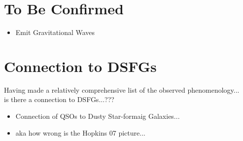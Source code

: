 \documentclass[usenatbib]{mn2e}
\begin{document}
\section{To Be Confirmed} %
\begin{itemize}
  \item{Emit Gravitational Waves}
\end{itemize}


\section{Connection to DSFGs} 
Having made a relatively comprehensive list of the observed phenomenology...\\
is there a connection to  DSFGs...???\\
\begin{itemize}
  \item{Connection of QSOs to Dusty Star-formaig Galaxies...}
    \item{aka how wrong is the Hopkins 07 picture...}
\end{itemize}






    




%


\end{document}
